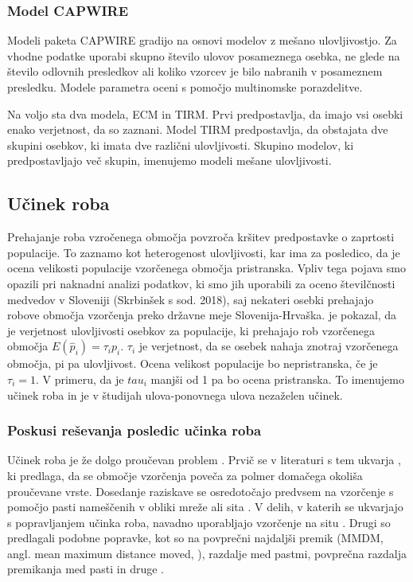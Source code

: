 \subsubsection{Model CAPWIRE}
Modeli paketa CAPWIRE \citep{miller_new_2005} gradijo na osnovi modelov z mešano ulovljivostjo. Za vhodne podatke uporabi skupno število ulovov posameznega osebka, ne glede na število odlovnih presledkov ali koliko vzorcev je bilo nabranih v posameznem presledku. Modele parametra oceni s pomočjo multinomske porazdelitve.

Na voljo sta dva modela, ECM in TIRM. Prvi predpostavlja, da imajo vsi osebki enako verjetnost, da so zaznani. Model TIRM predpostavlja, da obstajata dve skupini osebkov, ki imata dve različni ulovljivosti. Skupino modelov, ki predpostavljajo več skupin, imenujemo modeli mešane ulovljivosti.

\subsection{Učinek roba}
Prehajanje roba vzročenega območja povzroča kršitev predpostavke o zaprtosti populacije. To zaznamo kot heterogenost ulovljivosti, kar ima za posledico, da je ocena velikosti populacije vzorčenega območja pristranska. Vpliv tega pojava smo opazili pri naknadni analizi podatkov, ki smo jih uporabili za oceno številčnosti medvedov v Sloveniji (Skrbinšek s sod. 2018), saj nekateri osebki prehajajo robove območja vzorčenja preko državne meje Slovenija-Hrvaška. \citet{kendall_robustness_1999} je pokazal, da je verjetnost ulovljivosti osebkov za populacije, ki prehajajo rob vzorčenega območja $E(\hat{p}_i) = \tau_i p_i$. $\tau_i$ je verjetnost, da se osebek nahaja znotraj vzorčenega območja, pi pa ulovljivost. Ocena velikost populacije bo nepristranska, če je $\tau_i = 1$. V primeru, da je $tau_i$ manjši od 1 pa bo ocena pristranska. To imenujemo učinek roba \citep{hansson_home_1969, white_capture-recapture_1982, wilson_evaluation_1985} in je v študijah ulova-ponovnega ulova nezaželen učinek.

\subsubsection{Poskusi reševanja posledic učinka roba}
Učinek roba je že dolgo proučevan problem \citep{efford_density_2004}. Prvič se v literaturi  s tem ukvarja \citep{dice_census_1938, dice_methods_1941}, ki predlaga, da se območje vzorčenja poveča za polmer domačega okoliša proučevane vrste. Dosedanje raziskave se osredotočajo predvsem na vzorčenje s pomočjo pasti nameščenih v obliki mreže ali sita \citep{williams_analysis_2002}. V delih, v katerih se ukvarjajo s popravljanjem učinka roba, navadno uporabljajo vzorčenje na situ \citep{parmenter_small-mammal_2003}. Drugi so predlagali podobne popravke, kot so na povprečni najdaljši premik (MMDM, angl. mean maximum distance moved, \citet{wilson_evaluation_1985}), razdalje med pastmi, povprečna razdalja premikanja med pasti in druge \citep{miller_brown_1997, boulanger_corrigendum:_2001, royle_spatial_2013}.

